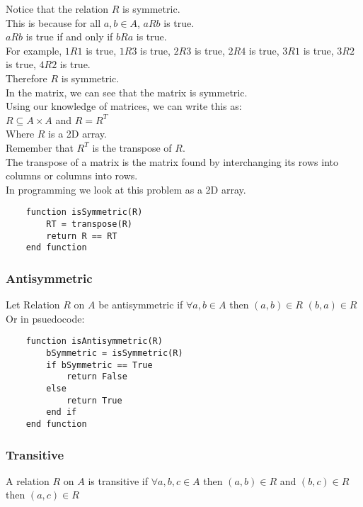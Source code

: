 Notice that the relation $R$ is symmetric. \\
This is because for all $a,b \in A$, $aRb$ is true. \\
$aRb$ is true if and only if $bRa$ is true. \\
For example, $1R1$ is true, $1R3$ is true, $2R3$ is true, $2R4$ is true, $3R1$ is true, $3R2$ is true, $4R2$ is true. \\
Therefore $R$ is symmetric. \\
In the matrix, we can see that the matrix is symmetric. \\

Using our knowledge of matrices, we can write this as: \\
$R \subseteq A \times A$ and $R = R^T$ \\
Where $R$ is a 2D array. \\

Remember that $R^T$ is the transpose of $R$. \\
The transpose of a matrix is the matrix found by interchanging its rows into columns or columns into rows.\\
In programming we look at this problem as a 2D array. \\

\begin{lstlisting}
    function isSymmetric(R)
        RT = transpose(R)
        return R == RT
    end function
\end{lstlisting}

\subsubsection{Antisymmetric}
Let Relation $R$ on $A$ be antisymmetric if $\forall a,b \in A$ then $(a,b) \in R$  $(b,a) \in R$ \\
Or in psuedocode: \\
\begin{lstlisting}
    function isAntisymmetric(R)
        bSymmetric = isSymmetric(R)
        if bSymmetric == True
            return False
        else
            return True
        end if
    end function
\end{lstlisting}

\subsubsection{Transitive}
A relation $R$ on $A$ is transitive if $\forall a,b,c \in A$ then $(a,b) \in R$ and $(b,c) \in R$ then $(a,c) \in R$ \\


